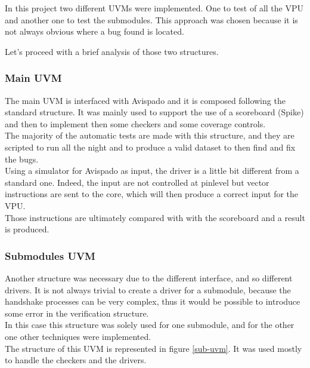 In this project two different UVMs were implemented. One to test of all the VPU and another one to test the submodules. This approach was chosen because it is not always obvious where a bug found is located.

Let's proceed with a brief analysis of those two structures.

\subsubsection{Main UVM}
The main UVM is interfaced with Avispado and it is composed following the standard structure. It was mainly used to support the use of a scoreboard (Spike) and then to implement then some checkers and some coverage controls.\\

The majority of the automatic tests are made with this structure, and they are scripted to run all the night and to produce a valid dataset to then find and fix the bugs.\\

Using a simulator for Avispado as input, the driver is a little bit different from a standard one. Indeed, the input are not controlled at pinlevel but vector instructions are sent to the core, which will then produce a correct input for the VPU.\\

Those instructions are ultimately compared with with the scoreboard and a result is produced.

\subsubsection{Submodules UVM}

Another structure was necessary due to the different interface, and so different drivers. It is not always trivial to create a driver for a submodule, because the handshake processes can be very complex, thus it would be possible to introduce some error in the verification structure.\\

In this case this structure was solely used for one submodule, and for the other one other techniques were implemented.\\

The structure of this UVM is represented in figure \ref{sub-uvm}. It was used mostly to handle the checkers and the drivers.


